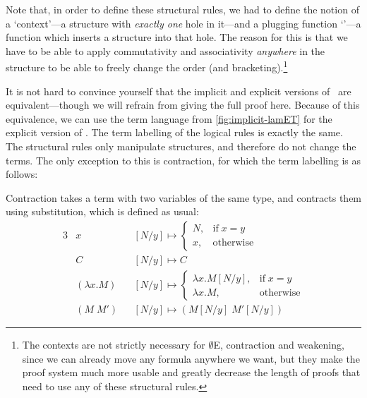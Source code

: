 

Note that, in order to define these structural rules, we had to define
the notion of a `context'---a structure with \emph{exactly one} hole
in it---and a plugging function `\plug'---a function which inserts a
structure into that hole. The reason for this is that we have to be
able to apply commutativity and associativity \emph{anywhere} in the
structure to be able to freely change the order (and
bracketing).\footnote{%
  The contexts are not strictly necessary for $\emptyset$E,
  contraction and weakening, since we can already move any formula
  anywhere we want, but they make the proof system much more usable
  and greatly decrease the length of proofs that need to use any of
  these structural rules.
}

It is not hard to convince yourself that the implicit and explicit
versions of \lamET\ are equivalent---though we will refrain from
giving the full proof here.
Because of this equivalence, we can use the term language from
\autoref{fig:implicit-lamET} for the explicit version of
\lamET.
The term labelling of the logical rules is exactly the same. The
structural rules only manipulate structures, and therefore do not
change the terms. The only exception to this is contraction, for which
the term labelling is as follows:
\begin{prooftree}
\end{prooftree}
Contraction takes a term with two variables of the same type, and
contracts them using substitution, which is defined as usual:
\begin{alignat*}{3}
  &x             &&[N/y] \mapsto
  \begin{cases}
    N, &\text{if}\;x=y\\
    x, &\text{otherwise}
  \end{cases}
  \\
  &C             &&[N/y] \mapsto C\\
  &(\lambda x.M) &&[N/y] \mapsto
  \begin{cases}
    \lambda x.M[N/y], &\text{if}\;x=y\\
    \lambda x.M,      &\text{otherwise}
  \end{cases}
  \\
  &(M\;M')       &&[N/y] \mapsto (M[N/y]\;M'[N/y])
\end{alignat*}

